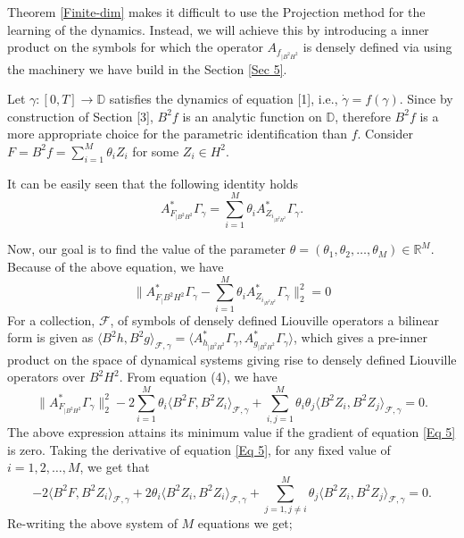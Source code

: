 \documentclass[preprint,12pt]{elsarticle} %
\theoremstyle{plain}
\theoremstyle{definition}
\theoremstyle{remark}
\begin{document}
Theorem \ref{Finite-dim} makes it difficult to use the Projection method for the learning of the dynamics. Instead, we will achieve this by introducing a inner product on the symbols for which the operator $A_{f_{|B^2 H^2}}$ is densely defined via using the machinery we have build in the Section \ref{Sec 5}. 

Let $\gamma:[0,T]\rightarrow \mathbb{D}$ satisfies the dynamics of equation [1], i.e., $\dot{\gamma}= f(\gamma)$. Since by construction of Section [3], $B^2f$ is an analytic function on $\mathbb{D}$, therefore $B^2f$ is a more appropriate choice for the parametric identification than $f$. Consider $F= B^2f=\sum_{i=1}^{M}\theta_i Z_i$ for some $Z_i\in H^2$. 

It can be easily seen that the following identity holds
\[
A_{F_{|B^2H^2}}^{*}\Gamma_{\gamma}=\sum_{i=1}^{M}\theta_i A_{Z_{i_{|B^2H^2}}}^{*}\Gamma_{\gamma}.
\]

Now, our goal is to find the value of the parameter $\theta = (\theta_1,\theta_2,\ldots, \theta_M)\in \mathbb{R}^M$. Because of the above equation, we have
\begin{equation}\label{Eq 4}
    \Big \| A_{F_|B^2H^2}^{*}\Gamma_{\gamma}- \sum_{i=1}^{M}\theta_i A_{Z_{i_{|B^2H^2}}}^{*}\Gamma_{\gamma} \Big\|_2 ^2 = 0
\end{equation}
 For a collection, $\mathcal{F}$, of symbols of densely defined Liouville operators a bilinear form is given as $\langle B^2 h, B^2g\rangle_{\mathcal{F},\gamma}= \langle A_{h_{|B^2H^2}}^{*}\Gamma_{\gamma}, A_{g_{|B^2H^2}}^{*}\Gamma_{\gamma}\rangle$,  which gives a pre-inner product on the space of dynamical systems giving rise to densely defined Liouville operators over $B^2H^2$. From equation (4), we have
 \begin{equation}\label{Eq 5}
     \|A_{F_{|B^2H^2}}^{*}\Gamma_{\gamma}\|_2^2-2\sum_{i=1}^{M} \theta_i\langle B^2 F, B^2 Z_i\rangle_{\mathcal{F},\gamma}+ \sum_{i,j=1}^{M} \theta_i\theta_j\langle B^2 Z_i, B^2 Z_j\rangle_{\mathcal{F},\gamma} = 0.
 \end{equation}
 The above expression attains its minimum value if the gradient of equation \ref{Eq 5} is zero. Taking the derivative of equation \ref{Eq 5}, for any fixed value of $i=1,2,\ldots, M$, we get that
\[
-2 \langle B^2 F, B^2 Z_i\rangle_{\mathcal{F},\gamma} + 2\theta_i\langle B^2 Z_i, B^2 Z_i\rangle_{\mathcal{F},\gamma}+\sum_{j=1,j\neq i}^{M} \theta_j\langle B^2 Z_i, B^2 Z_j\rangle_{\mathcal{F},\gamma} = 0.
\]
Re-writing the above system of $M$ equations we get;
\end{document}
